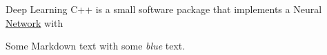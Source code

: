 Deep Learning C++ is a small software package that implements a Neural \hyperlink{classNetwork}{Network} with 

Some Markdown text with some {\itshape blue} text.